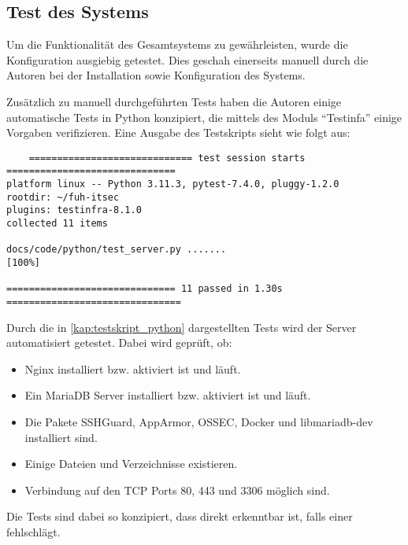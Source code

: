 \subsection{Test des Systems}

Um die Funktionalität des Gesamtsystems zu gewährleisten, wurde die Konfiguration ausgiebig getestet. Dies geschah einerseits manuell durch die Autoren bei der Installation sowie Konfiguration des Systems.

Zusätzlich zu manuell durchgeführten Tests haben die Autoren einige automatische Tests in Python konzipiert, die mittels des Moduls \enquote{Testinfa} einige Vorgaben verifizieren. Eine Ausgabe des Testskripts sieht wie folgt aus:

\begin{verbatim}
    ============================= test session starts ==============================
platform linux -- Python 3.11.3, pytest-7.4.0, pluggy-1.2.0
rootdir: ~/fuh-itsec
plugins: testinfra-8.1.0
collected 11 items

docs/code/python/test_server.py .......                                  [100%]

============================== 11 passed in 1.30s ===============================
\end{verbatim}

Durch die in \autoref{kap:testskript_python} dargestellten Tests wird der Server automatisiert getestet. Dabei wird geprüft, ob:

\begin{itemize}
    \item Nginx installiert bzw. aktiviert ist und läuft.
    \item Ein MariaDB Server installiert bzw. aktiviert ist und läuft.
    \item Die Pakete SSHGuard, AppArmor, OSSEC, Docker und libmariadb-dev installiert sind.
    \item Einige Dateien und Verzeichnisse existieren.
    \item Verbindung auf den TCP Ports 80, 443 und 3306 möglich sind.
\end{itemize}

Die Tests sind dabei so konzipiert, dass direkt erkenntbar ist, falls einer fehlschlägt.